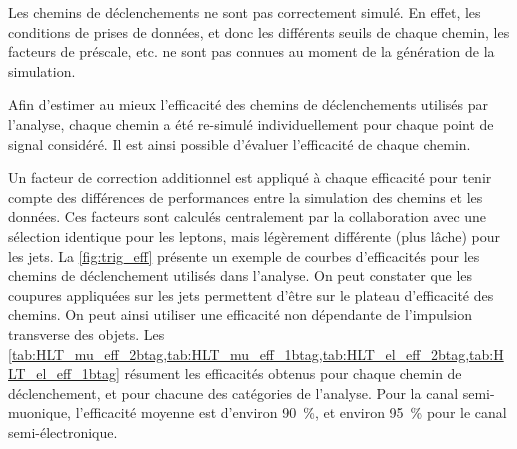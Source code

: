 Les chemins de déclenchements ne sont pas correctement simulé. En effet, les conditions de prises de données, et donc les différents seuils de chaque chemin, les facteurs de préscale, etc. ne sont pas connues au moment de la génération de la simulation.

Afin d'estimer au mieux l'efficacité des chemins de déclenchements utilisés par l'analyse, chaque chemin a été re-simulé individuellement pour chaque point de signal considéré. Il est ainsi possible d'évaluer l'efficacité de chaque chemin.

Un facteur de correction additionnel est appliqué à chaque efficacité pour tenir compte des différences de performances entre la simulation des chemins et les données. Ces facteurs sont calculés centralement par la collaboration avec une sélection identique pour les leptons, mais légèrement différente (plus lâche) pour les jets. La \cref{fig:trig_eff} présente un exemple de courbes d'efficacités pour les chemins de déclenchement utilisés dans l'analyse. On peut constater que les coupures appliquées sur les jets permettent d'être sur le plateau d'efficacité des chemins. On peut ainsi utiliser une efficacité non dépendante de l'impulsion transverse des objets. Les \cref{tab:HLT_mu_eff_2btag,tab:HLT_mu_eff_1btag,tab:HLT_el_eff_2btag,tab:HLT_el_eff_1btag} résument les efficacités obtenus pour chaque chemin de déclenchement, et pour chacune des catégories de l'analyse. Pour la canal semi-muonique, l'efficacité moyenne est d'environ \SI{90}{\%}, et environ \SI{95}{\%} pour le canal semi-électronique.



